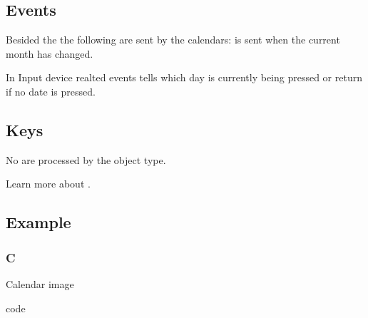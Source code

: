 \documentclass[letterpaper,10pt,english]{sphinxmanual}
\begin{document}
\subsection{Events}
\label{\detokenize{object-types/calendar:events}}
Besided the  the following  are sent by the calendars:
 is sent when  the current month has changed.

In Input device realted events  tells which day is currently being pressed or return  if no date is pressed.


\subsection{Keys}
\label{\detokenize{object-types/calendar:keys}}
No  are processed by the object type.

Learn more about {\hyperref[\detokenize{overview/indev::doc}]{}}.


\subsection{Example}
\label{\detokenize{object-types/calendar:example}}

\subsubsection{C}
\label{\detokenize{object-types/calendar:c}}
Calendar image

code
\end{document}
